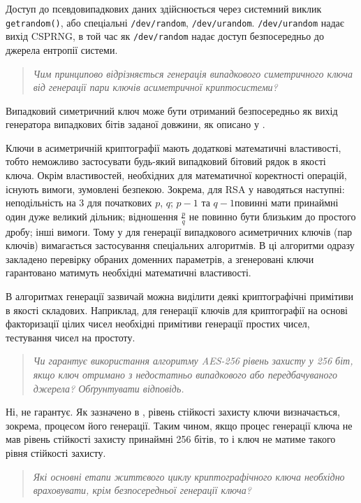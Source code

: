 \documentclass{kpi-lab}
\begin{document}
Доступ до псевдовипадкових даних здійснюється через  системний
виклик \texttt{getrandom()}, або спеціальні
\texttt{/dev/random}, \texttt{/dev/urandom}.
\texttt{/dev/urandom} надає вихід CSPRNG, в той час як
\texttt{/dev/random} надає доступ безпосередньо до джерела
ентропії системи.

\begin{quote}\small\it
  Чим принципово відрізняється генерація випадкового
  симетричного ключа від генерації пари ключів асиметричної
  криптосистеми?
\end{quote}

Випадковий симетричний ключ може бути
отриманий безпосередньо як вихід генератора випадкових бітів
заданої довжини, як описано у \cite{Barker2020}.

Ключи в асиметричній криптографії мають додаткові
математичні властивості, тобто неможливо застосувати
будь-який випадковий бітовий рядок в якості ключа.
Окрім властивостей, необхідних для математичної коректності операцій,
існують вимоги, зумовлені безпекою. Зокрема, для RSA у
\cite[][\pagename 405]{Knuth2021}
наводяться наступні: неподільність на 3 для початкових \(p\), \(q\);
\(p-1\) та \(q-1\)повинні мати принаймні один дуже великий дільник;
відношення \(\frac{p}{q}\) не повинно бути близьким до простого дробу;
інші вимоги.
Тому у \cite{Barker2020} для
генерації випадкового асиметричних ключів (пар ключів) вимагається
застосування спеціальних алгоритмів. В ці алгоритми одразу
закладено перевірку обраних доменних параметрів,
а згенеровані ключи гарантовано матимуть необхідні
математичні властивості.

В алгоритмах генерації зазвичай
можна виділити деякі криптографічні примітиви в якості складових.
Наприклад, для генерації ключів для криптографії на основі
факторизації цілих чисел необхідні примітиви генерації простих чисел,
тестування чисел на простоту.

\begin{quote}\small\it
  Чи гарантує використання алгоритму AES-256 рівень захисту
  у 256 біт, якщо ключ отримано з недостатньо випадкового
  або передбачуваного джерела? Обґрунтувати відповідь.
\end{quote}

Ні, не гарантує.
Як зазначено в \cite{Barker2020}, рівень стійкості захисту
ключи визначається, зокрема,
процесом його генерації. Таким чином, якщо процес генерації
ключа не мав рівень стійкості захисту
принаймні 256 бітів, то і ключ не матиме такого рівня
стійкості захисту.

\begin{quote}\small\it
  Які основні етапи життєвого циклу криптографічного ключа
  необхідно враховувати, крім безпосередньої генерації ключа?
\end{quote}
\end{document}
